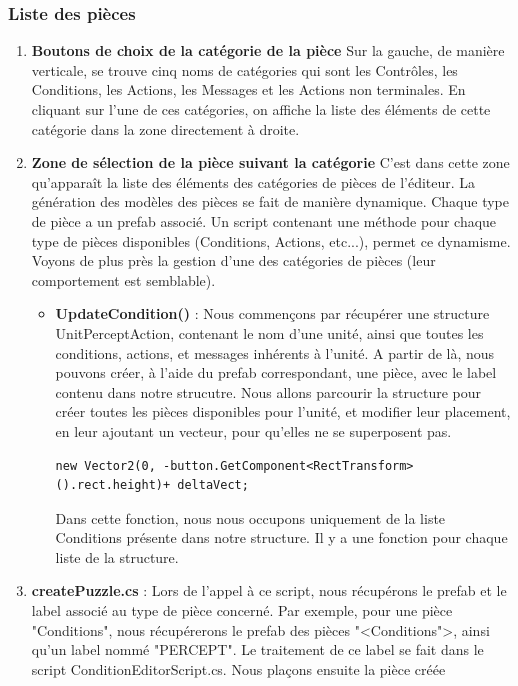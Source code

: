 \documentclass{report}
\begin{document}
\subsubsection{Liste des pièces}
\begin{enumerate}[label=\Alph*)]
\item\textbf{Boutons de choix de la catégorie de la pièce} \newline
Sur la gauche, de manière verticale, se trouve cinq noms de catégories qui sont les Contrôles, les Conditions, les Actions, les Messages et les Actions non terminales. En cliquant sur l'une de ces catégories, on affiche la liste des éléments de cette catégorie dans la zone directement à droite.
\item\textbf{Zone de sélection de la pièce suivant la catégorie} \newline
C'est dans cette zone qu’apparaît la liste des éléments des catégories de pièces de l'éditeur. La génération des modèles des pièces se fait de manière dynamique. Chaque type de pièce a un prefab associé. \newline
Un script contenant une méthode pour chaque type de pièces disponibles (Conditions, Actions, etc...), permet ce dynamisme. Voyons de plus près la gestion d'une des catégories de pièces (leur comportement est semblable).
\begin{itemize}
\item\textbf{UpdateCondition()} : Nous commençons par récupérer une structure UnitPerceptAction, contenant le nom d'une unité, ainsi que toutes les conditions, actions, et messages inhérents à l'unité.\newline
A partir de là, nous pouvons créer, à l'aide du prefab correspondant, une pièce, avec le label contenu dans notre strucutre.
Nous allons parcourir la structure pour créer toutes les pièces disponibles pour l'unité, et modifier leur placement, en leur ajoutant un vecteur, pour qu'elles ne se superposent pas.
\begin{lstlisting}[frame=single]
new Vector2(0, -button.GetComponent<RectTransform>().rect.height)+ deltaVect;
\end{lstlisting}
Dans cette fonction, nous nous occupons uniquement de la liste Conditions présente dans notre structure. Il y a une fonction pour chaque liste de la structure.
\end{itemize}
\item\textbf{createPuzzle.cs} : Lors de l'appel à ce script, nous récupérons le prefab et le label associé au type de pièce concerné. Par exemple, pour une pièce "Conditions", nous récupérerons le prefab des pièces "<Conditions">, ainsi qu'un label nommé "PERCEPT". Le traitement de ce label se fait dans le script ConditionEditorScript.cs.\newline
Nous plaçons ensuite la pièce créée 


\end{enumerate}
\end{document}
